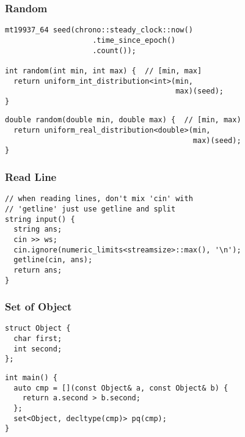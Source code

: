 \documentclass[twoside]{article}
\begin{document}
\begin{multicols*}{2}
\subsubsectionfont{\large\bfseries\sffamily\underline}
\subsubsection*{Random}
\begin{verbatim}
mt19937_64 seed(chrono::steady_clock::now()
                    .time_since_epoch()
                    .count());

int random(int min, int max) {  // [min, max]
  return uniform_int_distribution<int>(min,
                                       max)(seed);
}
\end{verbatim}
\vspace{-12pt}
\begin{verbatim}
double random(double min, double max) {  // [min, max)
  return uniform_real_distribution<double>(min,
                                           max)(seed);
}
\end{verbatim}

\subsubsectionfont{\large\bfseries\sffamily\underline}
\subsubsection*{Read Line}
\begin{verbatim}
// when reading lines, don't mix 'cin' with
// 'getline' just use getline and split
string input() {
  string ans;
  cin >> ws;
  cin.ignore(numeric_limits<streamsize>::max(), '\n');
  getline(cin, ans);
  return ans;
}
\end{verbatim}

\subsubsectionfont{\large\bfseries\sffamily\underline}
\subsubsection*{Set of Object}
\begin{verbatim}
struct Object {
  char first;
  int second;
};
\end{verbatim}
\vspace{-12pt}
\begin{verbatim}
int main() {
  auto cmp = [](const Object& a, const Object& b) {
    return a.second > b.second;
  };
  set<Object, decltype(cmp)> pq(cmp);
}
\end{verbatim}


\end{multicols*}
\end{document}
